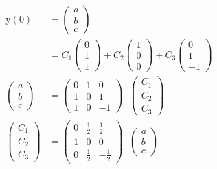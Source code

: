 \documentclass[10pt]{article}
\begin{document}
\begin{multicols}{2}
  \begin{align*}
    \mathrm{y}\left(0\right) &= \begin{pmatrix}a\\b\\c\end{pmatrix}\\
                             &= C_1\begin{pmatrix}0\\1\\1\end{pmatrix} +
    C_2 \begin{pmatrix}1\\0\\0\end{pmatrix} +
    C_3 \begin{pmatrix}0\\1\\-1\end{pmatrix}\\
    \begin{pmatrix}
      a\\b\\c
      \end{pmatrix} &= \begin{pmatrix}
      0 & 1 & 0\\1 & 0 & 1\\1 & 0 & -1
      \end{pmatrix} \cdot \begin{pmatrix}
      C_1 \\ C_2 \\ C_3
    \end{pmatrix}\\
    \begin{pmatrix}
      C_1 \\ C_2 \\ C_3
      \end{pmatrix} &= \begin{pmatrix}
      0 & \frac{1}{2} & \frac{1}{2}\\
      1 & 0 & 0\\
      0 & \frac{1}{2} & -\frac{1}{2}
      \end{pmatrix} \cdot \begin{pmatrix}
      a \\ b \\ c
    \end{pmatrix}
  \end{align*}


\end{multicols}
\end{document}
